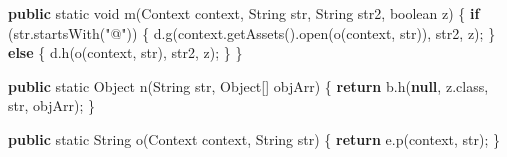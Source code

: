 \documentclass[
]{article}
\newenvironment{Shaded}{}{}
\newcommand{\BuiltInTok}[1]{\textcolor[rgb]{0.00,0.50,0.00}{#1}}
\newcommand{\ControlFlowTok}[1]{\textcolor[rgb]{0.00,0.44,0.13}{\textbf{#1}}}
\newcommand{\DataTypeTok}[1]{\textcolor[rgb]{0.56,0.13,0.00}{#1}}
\newcommand{\FunctionTok}[1]{\textcolor[rgb]{0.02,0.16,0.49}{#1}}
\newcommand{\KeywordTok}[1]{\textcolor[rgb]{0.00,0.44,0.13}{\textbf{#1}}}
\newcommand{\NormalTok}[1]{#1}
\newcommand{\OperatorTok}[1]{\textcolor[rgb]{0.40,0.40,0.40}{#1}}
\newcommand{\StringTok}[1]{\textcolor[rgb]{0.25,0.44,0.63}{#1}}
\begin{document}
\begin{Shaded}
\begin{Highlighting}[]
    \KeywordTok{public} \DataTypeTok{static} \DataTypeTok{void} \FunctionTok{m}\OperatorTok{(}\BuiltInTok{Context}\NormalTok{ context}\OperatorTok{,} \BuiltInTok{String}\NormalTok{ str}\OperatorTok{,} \BuiltInTok{String}\NormalTok{ str2}\OperatorTok{,} \DataTypeTok{boolean}\NormalTok{ z}\OperatorTok{)} \OperatorTok{\{}
        \ControlFlowTok{if} \OperatorTok{(}\NormalTok{str}\OperatorTok{.}\FunctionTok{startsWith}\OperatorTok{(}\StringTok{"@"}\OperatorTok{))} \OperatorTok{\{}
\NormalTok{            d}\OperatorTok{.}\FunctionTok{g}\OperatorTok{(}\NormalTok{context}\OperatorTok{.}\FunctionTok{getAssets}\OperatorTok{().}\FunctionTok{open}\OperatorTok{(}\FunctionTok{o}\OperatorTok{(}\NormalTok{context}\OperatorTok{,}\NormalTok{ str}\OperatorTok{)),}\NormalTok{ str2}\OperatorTok{,}\NormalTok{ z}\OperatorTok{);}
        \OperatorTok{\}} \ControlFlowTok{else} \OperatorTok{\{}
\NormalTok{            d}\OperatorTok{.}\FunctionTok{h}\OperatorTok{(}\FunctionTok{o}\OperatorTok{(}\NormalTok{context}\OperatorTok{,}\NormalTok{ str}\OperatorTok{),}\NormalTok{ str2}\OperatorTok{,}\NormalTok{ z}\OperatorTok{);}
        \OperatorTok{\}}
    \OperatorTok{\}}

    \KeywordTok{public} \DataTypeTok{static} \BuiltInTok{Object} \FunctionTok{n}\OperatorTok{(}\BuiltInTok{String}\NormalTok{ str}\OperatorTok{,} \BuiltInTok{Object}\OperatorTok{[]}\NormalTok{ objArr}\OperatorTok{)} \OperatorTok{\{}
        \ControlFlowTok{return}\NormalTok{ b}\OperatorTok{.}\FunctionTok{h}\OperatorTok{(}\KeywordTok{null}\OperatorTok{,}\NormalTok{ z}\OperatorTok{.}\FunctionTok{class}\OperatorTok{,}\NormalTok{ str}\OperatorTok{,}\NormalTok{ objArr}\OperatorTok{);}
    \OperatorTok{\}}

    \KeywordTok{public} \DataTypeTok{static} \BuiltInTok{String} \FunctionTok{o}\OperatorTok{(}\BuiltInTok{Context}\NormalTok{ context}\OperatorTok{,} \BuiltInTok{String}\NormalTok{ str}\OperatorTok{)} \OperatorTok{\{}
        \ControlFlowTok{return}\NormalTok{ e}\OperatorTok{.}\FunctionTok{p}\OperatorTok{(}\NormalTok{context}\OperatorTok{,}\NormalTok{ str}\OperatorTok{);}
    \OperatorTok{\}}


\end{Highlighting}
\end{Shaded}
\end{document}
